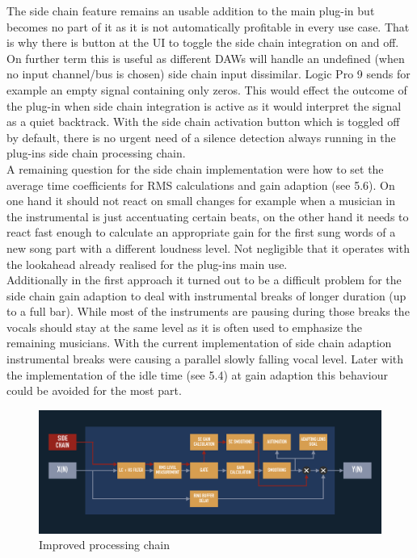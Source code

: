 The side chain feature remains an usable addition to the main plug-in but becomes no part of it as it is not automatically profitable in every use case. That is why there is button at the UI to toggle the 
side chain integration on and off. On further term this is useful as different DAWs will handle an undefined (when no input channel/bus is chosen) side chain input dissimilar. Logic Pro 9 sends for example an empty signal containing only zeros. This would effect the outcome of the plug-in when side chain integration is active as it would interpret the signal as a quiet backtrack. With the side chain activation button which is toggled off by default, there is no urgent need of a silence detection always running in the plug-ins side chain processing chain.\\
A remaining question for the side chain implementation were how to set the average time coefficients for RMS calculations and gain adaption (see 5.6). On one hand it should not react on small changes for example when a musician in the instrumental is just accentuating certain beats, on the other hand it needs to react fast enough to calculate an appropriate gain for the first sung words of a new song part with a different loudness level. Not negligible that it operates with the lookahead already realised for the plug-ins main use.\\
Additionally in the first approach it turned out to be a difficult problem for the side chain gain adaption to deal with instrumental breaks of longer duration (up to a full bar). While most of the instruments are pausing during those breaks the vocals should stay at the same level as it is often used to emphasize the remaining musicians. With the current implementation of side chain adaption instrumental breaks were causing a parallel slowly falling vocal level. Later with the implementation of the idle time (see 5.4) at gain adaption this behaviour could be avoided for the most part.\\

\begin{figure}[H]
\includegraphics[width=\textwidth]{images/chain02}
\caption{Improved processing chain}
\end{figure}

